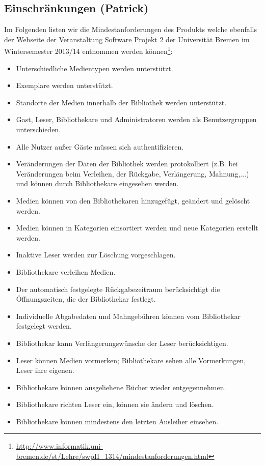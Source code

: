 \documentclass[fontsize=12pt,paper=a4,twoside]{scrartcl}
\begin{document}
\subsection{Einschränkungen (Patrick)} \label{subsec:Einschraenkungen} Im Folgenden listen wir die Mindestanforderungen des Produkts welche ebenfalls der Webseite der Veranstaltung Software Projekt 2 der Universität Bremen im Wintersemester 2013/14 entnommen werden können\footnote{\url{http://www.informatik.uni-bremen.de/st/Lehre/swpII_1314/mindestanforderungen.html}}: 
\begin{itemize}
	\item Unterschiedliche Medientypen werden unterstützt. 
	\item Exemplare werden unterstützt. 
	\item Standorte der Medien innerhalb der Bibliothek werden unterstützt. 
	\item Gast, Leser, Bibliothekare und Administratoren werden als Benutzergruppen unterschieden. 
	\item Alle Nutzer außer Gäste müssen sich authentifizieren. 
	\item Veränderungen der Daten der Bibliothek werden protokolliert (z.B. bei Veränderungen beim Verleihen, der Rückgabe, Verlängerung, Mahnung,...) und können durch Bibliothekare eingesehen werden. 
	\item Medien können von den Bibliothekaren hinzugefügt, geändert und gelöscht werden. 
	\item Medien können in Kategorien einsortiert werden und neue Kategorien erstellt werden. 
	\item Inaktive Leser werden zur Löschung vorgeschlagen. 
	\item Bibliothekare verleihen Medien. 
	\item Der automatisch festgelegte Rückgabezeitraum berücksichtigt die Öffnungszeiten, die der Bibliothekar festlegt. 
	\item Individuelle Abgabedaten und Mahngebühren können vom Bibliothekar festgelegt werden. 
	\item Bibliothekar kann Verlängerungswünsche der Leser berücksichtigen. 
	\item Leser können Medien vormerken; Bibliothekare sehen alle Vormerkungen, Leser ihre eigenen. 
	\item Bibliothekare können ausgeliehene Bücher wieder entgegennehmen. 
	\item Bibliothekare richten Leser ein, können sie ändern und löschen. 
	\item Bibliothekare können mindestens den letzten Ausleiher einsehen. 

\end{itemize}
\end{document}
